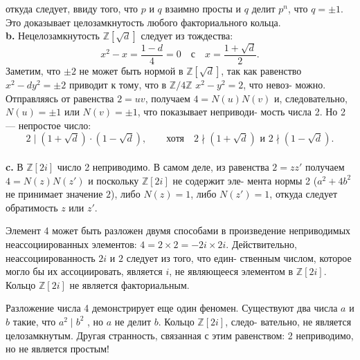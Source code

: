 откуда следует, ввиду того, что $p$ и $q$ взаимно просты и $q$ делит $p^n$,\linebreak
что $q=\pm1$. Это доказывает целозамкнутость любого факториального\linebreak
кольца.\newline
\\
\hspace*{15pt}\textbf{b.} Нецелозамкнутость $\mathbb{Z}[\sqrt{d}]$ следует из тождества:
$$x^2-x=\frac{1-d}{4}=0\quad \text{с}\quad x=\frac{1+\sqrt{d}}{2}.$$
\newpage
%
%
\noindent Заметим, что $\pm2$ не может быть нормой в $\mathbb{Z}[\sqrt{d}]$, так как равенство\linebreak
$x^2-dy^2=\pm2$ приводит к тому, что в $\mathbb{Z}/4\mathbb{Z}$ $x^2-y^2=2$, что невоз-\linebreak
можно. Отправляясь от равенства $2=uv$, получаем $4=N(u)N(v)$ и,\linebreak
следовательно, $N(u)=\pm1$ или $N(v)=\pm1$, что показывает неприводи-\linebreak
мость числа 2. Но 2 — непростое число:
$$2\mid(1+\sqrt{d})\cdot(1-\sqrt{d}),\qquad\text{хотя}\quad 2\nmid(1+\sqrt{d})\text{ и }2\nmid(1-\sqrt{d}).$$
\\
\hspace*{15pt}\textbf{c.} В $\mathbb{Z}[2i]$ число 2 неприводимо. В самом деле, из равенства\linebreak
$2=zz'$ получаем $4=N(z)N(z')$ и поскольку $\mathbb{Z}[2i]$ не содержит эле-\linebreak
мента нормы 2 ($a^2+4b^2$ не принимает значение $2$), либо $N(z)=1$, либо\linebreak
$N(z')=1$, откуда следует обратимость $z$ или $z'$.

Элемент 4 может быть разложен двумя способами в произведение\linebreak
неприводимых неассоциированных элементов: $4=2\times2=-2i\times2i$.\linebreak
Действительно, неассоциированность $2i$ и $2$ следует из того, что един-\linebreak
ственным числом, которое могло бы их ассоциировать, является $i$, не\linebreak
являющееся элементом в $\mathbb{Z}[2i]$. Кольцо $\mathbb{Z}[2i]$ не является факториаль­ным.\linebreak

Разложение числа 4 демонстрирует еще один феномен. Существуют\linebreak
два числа $a$ и $b$ такие, что $a^2\mid b^2$ , но $a$ не делит $b$. Кольцо $\mathbb{Z}[2i]$, следо-\linebreak
вательно, не является целозамкнутым. Другая странность, связанная с\linebreak
этим равенством: 2 неприводимо, но не является простым!

